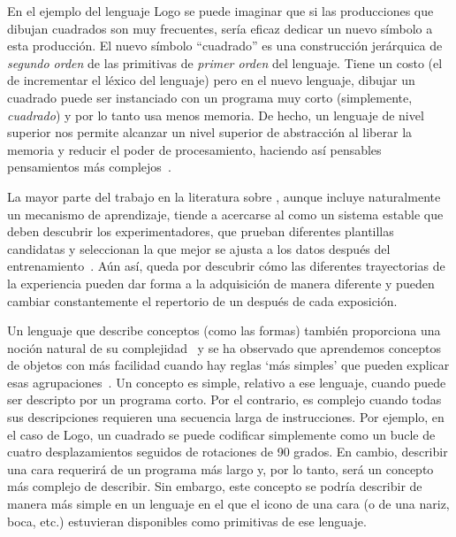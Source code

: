 En el ejemplo del lenguaje Logo se puede imaginar que si las producciones que dibujan cuadrados son muy frecuentes, sería eficaz dedicar un nuevo símbolo a esta producción. El nuevo símbolo ``cuadrado'' es una construcción jerárquica de {\em segundo orden} de las primitivas de {\em primer orden} del lenguaje. Tiene un costo (el de incrementar el léxico del lenguaje) pero en el nuevo lenguaje, dibujar un cuadrado puede ser instanciado con un programa muy corto (simplemente, {\em cuadrado}) y por lo tanto usa menos memoria. De hecho, un lenguaje de nivel superior nos permite alcanzar un nivel superior de abstracción al liberar la memoria y reducir el poder de procesamiento, haciendo así pensables pensamientos más complejos~\cite{minsky1967computation, murphy1988comprehending}.

La mayor parte del trabajo en la literatura sobre \lot, aunque incluye naturalmente un mecanismo de aprendizaje, tiende a acercarse al \lot como un sistema estable que deben descubrir los experimentadores, que prueban diferentes plantillas candidatas y seleccionan la que mejor se ajusta a los datos después del entrenamiento~\cite{goodman2008rational, kemp2012exploring, piantadosi2016logical}. Aún así, queda por descubrir cómo las diferentes trayectorias de la experiencia pueden dar forma a la adquisición de manera diferente y pueden cambiar constantemente el repertorio de un \lot después de cada exposición.

Un lenguaje que describe conceptos (como las formas) también proporciona una noción natural de su complejidad~\cite{kolmogorov1965three} y se ha observado que aprendemos conceptos de objetos con más facilidad cuando hay reglas `más simples' que pueden explicar esas agrupaciones~\cite{shepard1961learning, nosofsky1994comparing, rehder2005eyetracking, lewandowsky2011working, feldman2000minimization, blair2003easy, minda2001prototypes}. Un concepto es simple, relativo a ese lenguaje, cuando puede ser descripto por un programa corto. Por el contrario, es complejo cuando todas sus descripciones requieren una secuencia larga de instrucciones. Por ejemplo, en el caso de Logo, un cuadrado se puede codificar simplemente como un bucle de cuatro desplazamientos seguidos de rotaciones de 90 grados. En cambio, describir una cara requerirá de un programa más largo y, por lo tanto, será un concepto más complejo de describir. Sin embargo, este concepto se podría describir de manera más simple en un lenguaje en el que el icono de una cara (o de una nariz, boca, etc.) estuvieran disponibles como primitivas de ese lenguaje. 

